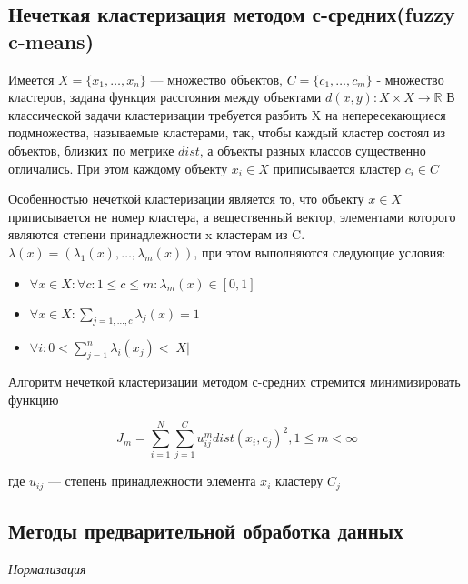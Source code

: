 \documentclass[12pt]{article} %
\begin{document}
\subsection{Нечеткая кластеризация методом с-средних(fuzzy c-means)}
Имеется $X=\{x_{1},\dots,x_{n}\}$ --- множество объектов, $C=\{c_{1},\dots,c_{m}\}$ - множество кластеров, задана функция расстояния между объектами $d(x, y): X\times X  \to \mathbb{R}$ В классической задачи кластеризации требуется разбить X на непересекающиеся подмножества, называемые кластерами, так, чтобы каждый кластер состоял из объектов, близких по метрике $dist$, а объекты разных классов существенно отличались. При этом каждому объекту $x_{i} \in X$ приписывается кластер $c_{i} \in C$
\par
 Особенностью нечеткой кластеризации является то, что объекту $x \in X$ приписывается не номер кластера, а вещественный вектор, элементами которого являются степени принадлежности x кластерам из C. $\lambda(x)=(\lambda_{1}(x),\dots,\lambda_{m}(x)) $, при этом выполняются следующие условия:
 \begin{itemize}
 \item $\forall x \in X: \forall c: 1\leq c \leq m:  \lambda_{m}(x) \in [0,1]$
 \item $\forall x \in X: \sum_{j=1,\dots,c} \lambda_{j}(x) = 1$
 \item $\forall i : 0 < \sum_{j=1}^{n} \lambda_{i}(x_{j}) < |X|  $
 \end{itemize} 
 \par

Алгоритм нечеткой кластеризации методом с-средних стремится минимизировать функцию

\[
	J_{m} = \sum_{i=1}^{N} \sum_{j=1}^{C} u_{ij}^m dist(x_{i}, c_{j})^2, 1 \leq m < \infty
\]

где $u_{ij}$ --- степень принадлежности элемента $x_{i}$ кластеру $C_{j}$

	

\subsection{Методы предварительной обработка данных}
\textit{Нормализация}
\end{document}
